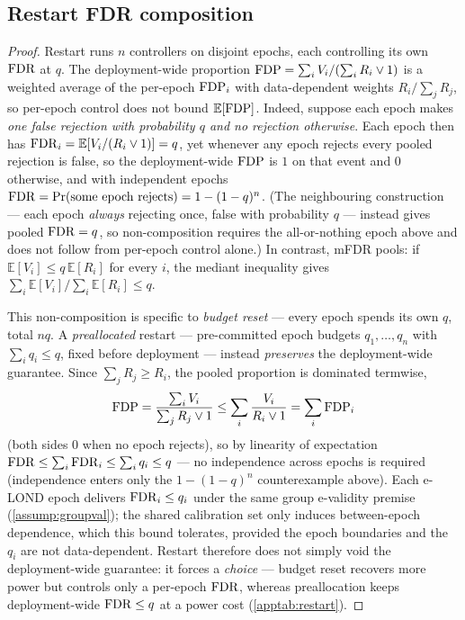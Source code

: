 \subsection{Restart FDR composition}

\begin{proof}
Restart runs $n$ controllers on disjoint epochs, each controlling its own $\mathrm{FDR}$ at $q$. The
deployment-wide proportion $\mathrm{FDP}=\sum_i V_i/(\sum_i R_i\vee1)$ is a weighted average of the
per-epoch $\mathrm{FDP}_i$ with data-dependent weights $R_i/\sum_j R_j$, so per-epoch control does not
bound $\mathbb{E}[\mathrm{FDP}]$. Indeed, suppose each epoch makes \emph{one false rejection with
probability $q$ and no rejection otherwise}. Each epoch then has
$\mathrm{FDR}_i=\mathbb{E}[V_i/(R_i\vee1)]=q$, yet whenever any epoch rejects every pooled rejection is
false, so the deployment-wide $\mathrm{FDP}$ is $1$ on that event and $0$ otherwise, and with independent
epochs $\mathrm{FDR}=\Pr(\text{some epoch rejects})=1-(1-q)^n$. (The neighbouring construction --- each epoch
\emph{always} rejecting once, false with probability $q$ --- instead gives pooled $\mathrm{FDR}=q$, so
non-composition requires the all-or-nothing epoch above and does not follow from per-epoch control
alone.) In contrast, mFDR pools: if
$\mathbb{E}[V_i]\le q\,\mathbb{E}[R_i]$ for every $i$, the mediant inequality gives
$\sum_i\mathbb{E}[V_i]/\sum_i\mathbb{E}[R_i]\le q$.

This non-composition is specific to \emph{budget reset} --- every epoch spends its own $q$, total
$nq$. A \emph{preallocated} restart --- pre-committed epoch budgets $q_1,\dots,q_n$ with
$\sum_i q_i\le q$, fixed before deployment --- instead \emph{preserves} the deployment-wide guarantee.
Since $\sum_j R_j\ge R_i$, the pooled proportion is dominated termwise,
\[
\mathrm{FDP}=\frac{\sum_i V_i}{\sum_j R_j\vee1}\le\sum_i\frac{V_i}{R_i\vee1}=\sum_i\mathrm{FDP}_i
\]
(both sides $0$ when no epoch rejects), so by linearity of expectation
$\mathrm{FDR}\le\sum_i\mathrm{FDR}_i\le\sum_i q_i\le q$ --- no independence across epochs is required (independence
enters only the $1-(1-q)^n$ counterexample above). Each e-LOND epoch delivers $\mathrm{FDR}_i\le q_i$ under the
same group e-validity premise (\cref{assump:groupval}); the shared calibration set only induces
between-epoch dependence, which this bound tolerates, provided the epoch boundaries and the $q_i$ are
not data-dependent. Restart therefore does not simply void the deployment-wide guarantee: it forces a
\emph{choice} --- budget reset recovers more power but controls only a per-epoch $\mathrm{FDR}$, whereas
preallocation keeps deployment-wide $\mathrm{FDR}\le q$ at a power cost (\cref{apptab:restart}).
\end{proof}

